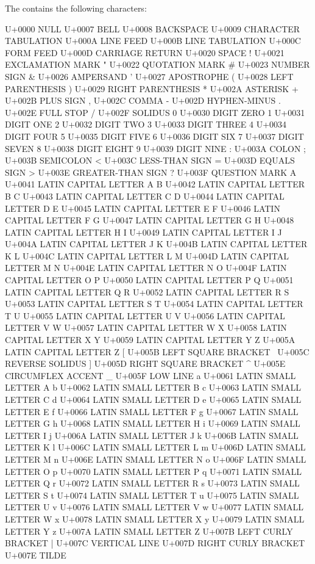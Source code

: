 \documentclass{wg21}
\begin{document}
\begin{addedblock}
The  contains the following characters:

\begin{codeblock}
   U+0000 NULL
   U+0007 BELL
   U+0008 BACKSPACE
   U+0009 CHARACTER TABULATION
   U+000A LINE FEED 
   U+000B LINE TABULATION
   U+000C FORM FEED
   U+000D CARRIAGE RETURN 
   U+0020 SPACE
!  U+0021 EXCLAMATION MARK
"  U+0022 QUOTATION MARK
#  U+0023 NUMBER SIGN
&  U+0026 AMPERSAND
'  U+0027 APOSTROPHE
(  U+0028 LEFT PARENTHESIS
)  U+0029 RIGHT PARENTHESIS
*  U+002A ASTERISK
+  U+002B PLUS SIGN
,  U+002C COMMA
-  U+002D HYPHEN-MINUS
.  U+002E FULL STOP
/  U+002F SOLIDUS
0  U+0030 DIGIT ZERO
1  U+0031 DIGIT ONE
2  U+0032 DIGIT TWO
3  U+0033 DIGIT THREE
4  U+0034 DIGIT FOUR
5  U+0035 DIGIT FIVE
6  U+0036 DIGIT SIX
7  U+0037 DIGIT SEVEN
8  U+0038 DIGIT EIGHT
9  U+0039 DIGIT NINE
:  U+003A COLON
;  U+003B SEMICOLON
<  U+003C LESS-THAN SIGN
=  U+003D EQUALS SIGN
>  U+003E GREATER-THAN SIGN
?  U+003F QUESTION MARK
A  U+0041 LATIN CAPITAL LETTER A
B  U+0042 LATIN CAPITAL LETTER B
C  U+0043 LATIN CAPITAL LETTER C
D  U+0044 LATIN CAPITAL LETTER D
E  U+0045 LATIN CAPITAL LETTER E
F  U+0046 LATIN CAPITAL LETTER F
G  U+0047 LATIN CAPITAL LETTER G
H  U+0048 LATIN CAPITAL LETTER H
I  U+0049 LATIN CAPITAL LETTER I
J  U+004A LATIN CAPITAL LETTER J
K  U+004B LATIN CAPITAL LETTER K
L  U+004C LATIN CAPITAL LETTER L
M  U+004D LATIN CAPITAL LETTER M
N  U+004E LATIN CAPITAL LETTER N
O  U+004F LATIN CAPITAL LETTER O
P  U+0050 LATIN CAPITAL LETTER P
Q  U+0051 LATIN CAPITAL LETTER Q
R  U+0052 LATIN CAPITAL LETTER R
S  U+0053 LATIN CAPITAL LETTER S
T  U+0054 LATIN CAPITAL LETTER T
U  U+0055 LATIN CAPITAL LETTER U
V  U+0056 LATIN CAPITAL LETTER V
W  U+0057 LATIN CAPITAL LETTER W
X  U+0058 LATIN CAPITAL LETTER X
Y  U+0059 LATIN CAPITAL LETTER Y
Z  U+005A LATIN CAPITAL LETTER Z
[  U+005B LEFT SQUARE BRACKET
\  U+005C REVERSE SOLIDUS
]  U+005D RIGHT SQUARE BRACKET
^  U+005E CIRCUMFLEX ACCENT
_  U+005F LOW LINE
a  U+0061 LATIN SMALL LETTER A
b  U+0062 LATIN SMALL LETTER B
c  U+0063 LATIN SMALL LETTER C
d  U+0064 LATIN SMALL LETTER D
e  U+0065 LATIN SMALL LETTER E
f  U+0066 LATIN SMALL LETTER F
g  U+0067 LATIN SMALL LETTER G
h  U+0068 LATIN SMALL LETTER H
i  U+0069 LATIN SMALL LETTER I
j  U+006A LATIN SMALL LETTER J
k  U+006B LATIN SMALL LETTER K
l  U+006C LATIN SMALL LETTER L
m  U+006D LATIN SMALL LETTER M
n  U+006E LATIN SMALL LETTER N
o  U+006F LATIN SMALL LETTER O
p  U+0070 LATIN SMALL LETTER P
q  U+0071 LATIN SMALL LETTER Q
r  U+0072 LATIN SMALL LETTER R
s  U+0073 LATIN SMALL LETTER S
t  U+0074 LATIN SMALL LETTER T
u  U+0075 LATIN SMALL LETTER U
v  U+0076 LATIN SMALL LETTER V
w  U+0077 LATIN SMALL LETTER W
x  U+0078 LATIN SMALL LETTER X
y  U+0079 LATIN SMALL LETTER Y
z  U+007A LATIN SMALL LETTER Z
{  U+007B LEFT CURLY BRACKET
|  U+007C VERTICAL LINE
}  U+007D RIGHT CURLY BRACKET
~  U+007E TILDE
\end{codeblock}


\end{addedblock}
\end{document}
